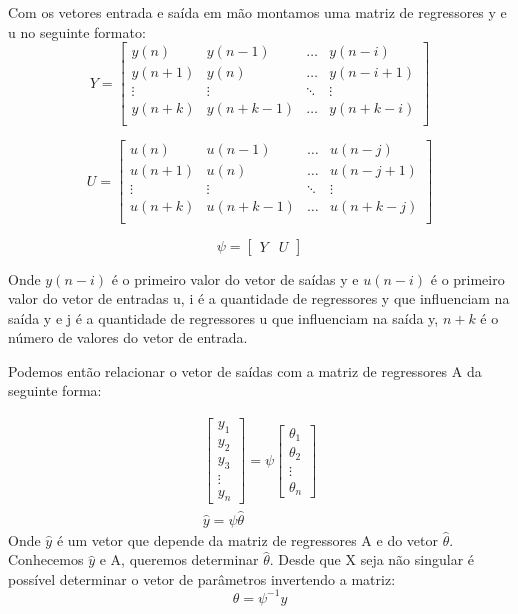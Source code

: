 Com os vetores entrada e saída em mão montamos uma matriz de regressores y e u no seguinte formato:
\begin{equation}
Y=\begin{bmatrix}
y(n) & y(n-1) & \dots & y(n-i) \\
y(n+1) & y(n) & \dots & y(n-i+1) \\
\vdots & \vdots & \ddots & \vdots\\
y(n+k) & y(n+k-1) & \dots & y(n+k-i) \\
\end{bmatrix}
\end{equation}

\begin{equation}
U=\begin{bmatrix}
 u(n) & u(n-1) & \dots & u(n-j)\\
 u(n+1) & u(n) & \dots & u(n-j+1)\\
 \vdots & \vdots & \ddots  & \vdots\\
 u(n+k) & u(n+k-1) & \dots & u(n+k-j)\\
\end{bmatrix}
\end{equation}

\begin{equation}\label{eq:regressores}
\psi=
\begin{bmatrix}
Y & U
\end{bmatrix}
\end{equation}

Onde $y(n-i)$ é o primeiro valor do vetor de saídas y e $u(n-i)$ é o primeiro valor do vetor de entradas u, i é a quantidade de regressores y que influenciam na saída y e j é a quantidade de regressores u que influenciam na saída y, $n+k$ é o número de valores do vetor de entrada.



Podemos então relacionar o vetor de saídas com a matriz de regressores A da seguinte forma:

\begin{equation}
\begin{array}{c}
\begin{bmatrix}
y_1 \\ y_2 \\ y_3\\ \vdots \\ y_n
\end{bmatrix}
=
\psi
\begin{bmatrix}
\theta_1 \\ \theta_2 \\ \vdots \\ \theta_n
\end{bmatrix}
\\
\hat{y}=\psi \hat{\theta}
\end{array}
\end{equation}
Onde $\hat{y}$ é um vetor que depende da matriz de regressores A e do vetor $\hat{\theta}$. Conhecemos $\hat{y}$ e A, queremos determinar $\hat{\theta}$. Desde que X seja não singular é possível determinar o vetor de parâmetros invertendo a matriz:
\begin{equation}\label{eq:MQ}
\theta=\psi^{-1}y
\end{equation}

